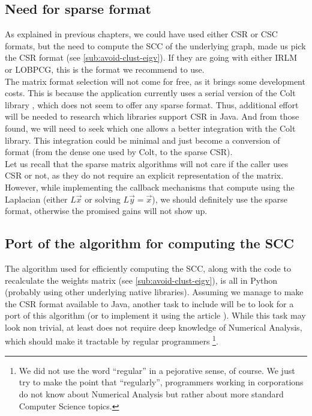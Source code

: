 \subsection{Need for sparse format}

As explained in previous chapters, we 
could have used either CSR or CSC formats, but the need to compute the
\gls{SCC} of the underlying graph, made us pick the CSR
format (see \cref{sub:avoid-clust-eigv}). If they are going with
either \gls{IRLM} or \gls{LOBPCG}, this is the format we recommend to use. \\


The matrix format selection will not come for free, as it brings
some development costs. 
This is because the application currently uses a serial version of the
Colt library \cite{colt}, which does not 
seem to offer any sparse format. Thus, additional effort will be
needed to research which libraries support CSR in Java. And from those
found, we will need to seek which one allows a better integration with
the Colt library. This integration could be minimal and just become a
conversion of format (from the dense one used by Colt, to the sparse
CSR).  \\

Let us recall that the sparse matrix algorithms will not care if the caller uses
CSR or not, as they do not require an explicit representation of the
matrix. However, while implementing the callback mechanisms that 
compute using the \gls{Laplacian} (either $L\vec{x}$ or solving $L\vec{y} =
\vec{x}$), we should definitely use the sparse format, otherwise the
promised gains will not show up.

\subsection{Port of the algorithm for computing the \gls{SCC}}

The algorithm used for efficiently computing the \gls{SCC}, along with the
code to recalculate the weights matrix (see
\cref{sub:avoid-clust-eigv}), is all in Python (probably 
using other underlying native libraries). Assuming we manage to make the CSR
format available to Java, another task to include will be to look for
a port of this algorithm (or to implement it using the article
\cite{pearce05}). While this task may look non trivial, at least does
not require deep knowledge of Numerical Analysis, which should make it
tractable by regular programmers \footnote{We did not use the
word ``regular'' in a pejorative sense, of course. We just try to make
the point that ``regularly'', programmers working in corporations do
not know about Numerical Analysis but rather about more standard
Computer Science topics.}.

